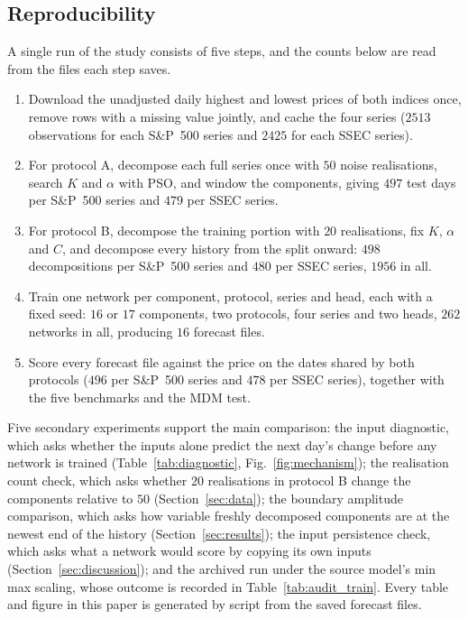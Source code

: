 \documentclass[pdflatex,sn-mathphys-num]{sn-jnl}%
\theoremstyle{thmstyleone}%
\theoremstyle{thmstyletwo}%
\theoremstyle{thmstylethree}%
\begin{document}
\subsection{Reproducibility}
A single run of the study consists of five steps, and the counts below are
read from the files each step saves.
\begin{enumerate}
\item Download the unadjusted daily highest and lowest prices of both indices
once, remove rows with a missing value jointly, and cache the four series
($2513$ observations for each S\&P~500 series and $2425$ for each SSEC series).
\item For protocol A, decompose each full series once with $50$ noise
realisations, search $K$ and $\alpha$ with PSO, and window the components,
giving $497$ test days per S\&P~500 series and $479$ per SSEC series.
\item For protocol B, decompose the training portion with $20$ realisations,
fix $K$, $\alpha$ and $C$, and decompose every history from the split onward:
$498$ decompositions per S\&P~500 series and $480$ per SSEC series, $1956$ in
all.
\item Train one network per component, protocol, series and head, each with a
fixed seed: $16$ or $17$ components, two protocols, four series and two heads,
$262$ networks in all, producing $16$ forecast files.
\item Score every forecast file against the price on the dates shared by both
protocols ($496$ per S\&P~500 series and $478$ per SSEC series), together with
the five benchmarks and the MDM test.
\end{enumerate}
Five secondary experiments support the main comparison: the input diagnostic,
which asks whether the inputs alone predict the next day's change before any
network is trained (Table~\ref{tab:diagnostic}, Fig.~\ref{fig:mechanism}); the
realisation count check, which asks whether $20$ realisations in protocol B
change the components relative to $50$ (Section~\ref{sec:data}); the boundary
amplitude comparison, which asks how variable freshly decomposed components are
at the newest end of the history (Section~\ref{sec:results}); the input
persistence check, which asks what a network would score by copying its own
inputs (Section~\ref{sec:discussion}); and the archived run under the source
model's min max scaling, whose outcome is recorded in Table~\ref{tab:audit_train}.
Every table and figure in this paper is generated by script from the saved
forecast files.
\end{document}
